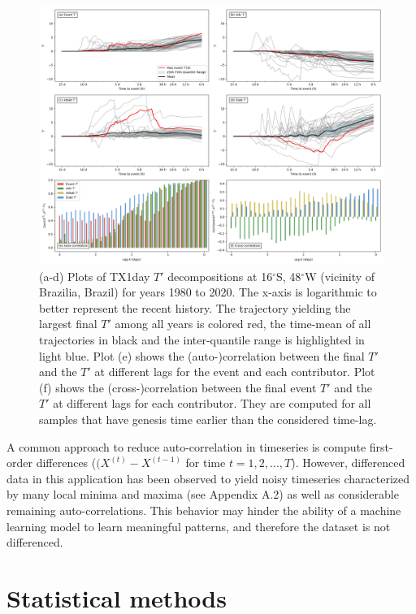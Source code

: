 \documentclass[11pt,a4paper,twoside,openright]{report}
\theoremstyle{definition}
\begin{document}
\begin{figure}[h]
\includegraphics[width=1\linewidth]{images/timeseries_data} \caption{(a-d) Plots of TX1day $T'$ decompositions at 16$^{\circ}$S, 48$^{\circ}$W (vicinity of Brazilia, Brazil) for years 1980 to 2020. The x-axis is logarithmic to better represent the recent history. The trajectory yielding the largest final $T'$ among all years is colored red, the time-mean of all trajectories in black and the inter-quantile range is highlighted in light blue. Plot (e) shows the (auto-)correlation between the final $T'$ and the $T'$ at different lags for the event and each contributor. Plot (f) shows the (cross-)correlation between the final event $T'$ and the $T'$ at different lags for each contributor. They are computed for all samples that have genesis time earlier than the considered time-lag.}\label{fig:timeseriesdata}
\end{figure}

A common approach to reduce auto-correlation in timeseries is compute first-order differences (\((X^{(t)}-X^{(t-1)}\) for time \(t=1,2,...,T\)). However, differenced data in this application has been observed to yield noisy timeseries characterized by many local minima and maxima (see Appendix A.2) as well as considerable remaining auto-correlations. This behavior may hinder the ability of a machine learning model to learn meaningful patterns, and therefore the dataset is not differenced.

\chapter{Statistical methods}\label{statistical-methods}
\end{document}
